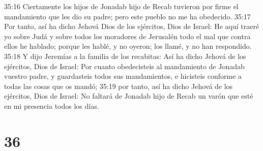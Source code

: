 35:16 Ciertamente los hijos de Jonadab hijo de Recab tuvieron por firme el mandamiento que les dio su padre; pero este pueblo no me ha obedecido.  
35:17 Por tanto, así ha dicho Jehová Dios de los ejércitos, Dios de Israel: He aquí traeré yo sobre Judá y sobre todos los moradores de Jerusalén todo el mal que contra ellos he hablado; porque les hablé, y no oyeron; los llamé, y no han respondido.  
35:18 Y dijo Jeremías a la familia de los recabitas: Así ha dicho Jehová de los ejércitos, Dios de Israel: Por cuanto obedecisteis al mandamiento de Jonadab vuestro padre, y guardasteis todos sus mandamientos, e hicisteis conforme a todas las cosas que os mandó;  
35:19 por tanto, así ha dicho Jehová de los ejércitos, Dios de Israel: No faltará de Jonadab hijo de Recab un varón que esté en mi presencia todos los días.  

\chapter{36}

